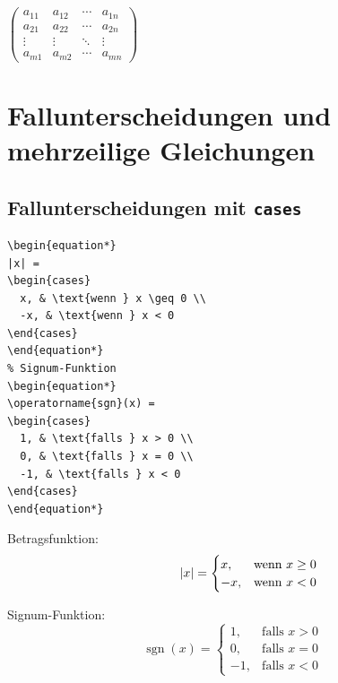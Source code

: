 \documentclass[12pt,a4paper]{article}
\begin{document}
\begin{ausgabe}
\begin{center}$\begin{pmatrix}
  a_{11} & a_{12} & \cdots & a_{1n} \\
  a_{21} & a_{22} & \cdots & a_{2n} \\
  \vdots & \vdots & \ddots & \vdots \\
  a_{m1} & a_{m2} & \cdots & a_{mn}
\end{pmatrix}$\end{center}
\end{ausgabe}



\section{Fallunterscheidungen und mehrzeilige Gleichungen}



\subsection{Fallunterscheidungen mit \texttt{cases}}

\begin{lstlisting}[style=latex]
% Betragsfunktion
\begin{equation*}
|x| = 
\begin{cases}
  x, & \text{wenn } x \geq 0 \\
  -x, & \text{wenn } x < 0
\end{cases}
\end{equation*}
% Signum-Funktion
\begin{equation*}
\operatorname{sgn}(x) = 
\begin{cases}
  1, & \text{falls } x > 0 \\
  0, & \text{falls } x = 0 \\
  -1, & \text{falls } x < 0
\end{cases}
\end{equation*}
\end{lstlisting}

\begin{ausgabe}
Betragsfunktion:
\begin{equation*}
\hspace{0.9cm} |x| = 
\begin{cases}
  x, & \text{wenn } x \geq 0 \\
  -x, & \text{wenn } x < 0
\end{cases}
\end{equation*}

Signum-Funktion:
\begin{equation*}
\operatorname{sgn}(x) = 
\begin{cases}
  1, & \text{falls } x > 0 \\
  0, & \text{falls } x = 0 \\
  -1, & \text{falls } x < 0
\end{cases}
\end{equation*}
\end{ausgabe}
\end{document}
